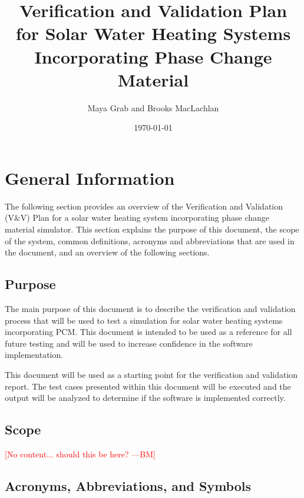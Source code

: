 \documentclass[12pt]{article}
\newcommand{\authornote}[3]{\textcolor{#1}{[#3 ---#2]}}
\newcommand{\authornote}[3]{}
\newcommand{\bmac}[1]{\authornote{red}{BM}{#1}}
\begin{document}
\title{Verification and Validation Plan for Solar Water Heating Systems Incorporating 
Phase Change Material} 
\author{Maya Grab and Brooks MacLachlan}
\date{\today}
	
\maketitle

\tableofcontents

%
%

\section{General Information}
The following section provides an overview of the Verification and Validation (V\&V) Plan 
for a solar water heating system incorporating phase change material simulator.
 This section explains the purpose of this document, the scope of the system,
  common definitions, acronyms and abbreviations that are used in the document,
   and an overview of the following sections.

\subsection{Purpose}
The main purpose of this document is to describe the verification and validation 
process that will be used to test a simulation for solar water heating systems incorporating PCM.
This document is intended to be used as a reference for all future testing and will
be used to increase confidence in the software implementation.  

This document will be used as a starting point for the verification and validation report. The 
test cases presented within this document will be executed and the output will be analyzed to 
determine if the software is implemented correctly.  


\subsection{Scope}

\bmac{No content... should this be here?}


\subsection{Acronyms, Abbreviations, and Symbols }
\end{document}
